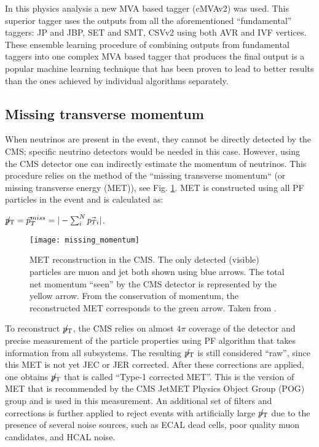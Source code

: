 In this physics analysis a new MVA based tagger (cMVAv2) was used. This superior tagger uses the outputs from all the aforementioned ``fundamental'' taggers: JP and JBP, SET and SMT, CSVv2 using both AVR and IVF vertices. These ensemble learning procedure \cite{ensemble_learning} of combining outputs from fundamental taggers into one complex MVA based tagger that produces the final output is a popular machine learning technique that has been proven to lead to better results than the ones achieved by individual algorithms separately. 

\subsection{Missing transverse momentum}\label{sec:met}

When neutrinos are present in the event, they cannot be directly detected by the CMS; specific neutrino detectors would be needed in this case. However, using the CMS detector one can indirectly estimate the momentum of neutrinos. This procedure relies on the method of the ``missing  transverse momentum`` \PTslash (or missing transverse energy  \ETslash (MET)), see Fig. \ref{missing_momentum}.  MET is constructed using all PF particles in the event and is calculated as:

${p}_\mathrm{T}\hspace{-1.02em}/\kern 0.5em = \vec{p}^{miss}_T = |- \sum^N_i \vec{p_{Ti}} |$. 




 \begin{figure}[H]
  \centering
  \texttt{[image: missing\_momentum]}
  \caption[MET reconstruction in the CMS.]{MET reconstruction in the CMS. The only detected (visible) particles are muon and jet both shown using blue arrows. The total net momentum ``seen'' by the CMS detector is represented by the yellow arrow. From the conservation of momentum, the reconstructed MET corresponds to the green arrow. Taken from \cite{missing_momentum}. }
  \label{missing_momentum}
\end{figure}





To reconstruct ${p}_\mathrm{T}\hspace{-1.02em}/\kern 0.5em$, the CMS relies on almost $4 \pi$ coverage of the detector and precise measurement of the particle properties using PF algorithm that takes information from all subsystems. The resulting ${p}_\mathrm{T}\hspace{-1.02em}/\kern 0.5em$ is still considered ``raw'', since this MET is not yet JEC or JER corrected. After these corrections are applied, one obtains  ${p}_\mathrm{T}\hspace{-1.02em}/\kern 0.5em$ that is called ``Type-1 corrected MET''. This is the version of MET that is recommended by the CMS JetMET Physics Object Group (POG) group and is used in this measurement. An additional set of filters and corrections is further applied to reject events with artificially large ${p}_\mathrm{T}\hspace{-1.02em}/\kern 0.5em$ due to the presence of several noise sources, such as ECAL dead cells, poor quality muon candidates, and HCAL noise. 

